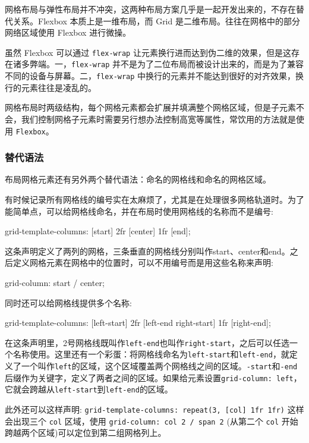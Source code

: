 网格布局与弹性布局并不冲突，这两种布局方案几乎是一起开发出来的，不存在替代关系。Flexbox 本质上是一维布局，而 Grid 是二维布局。往往在网格中的部分网络区域使用 Flexbox 进行微操。

虽然 Flexbox 可以通过 \texttt{flex-wrap} 让元素换行进而达到伪二维的效果，但是这存在诸多弊端。一，\texttt{flex-wrap} 并不是为了二位布局而被设计出来的，而是为了兼容不同的设备与屏幕。二，\texttt{flex-wrap} 中换行的元素并不能达到很好的对齐效果，换行的元素往往是凌乱的。

网格布局时两级结构，每个网格元素都会扩展并填满整个网格区域，但是子元素不会，我们控制网格子元素时需要另行想办法控制高宽等属性，常饮用的方法就是使用 \texttt{Flexbox}。

\subsubsection*{替代语法}

布局网格元素还有另外两个替代语法：命名的网格线和命名的网格区域。

有时候记录所有网格线的编号实在太麻烦了，尤其是在处理很多网格轨道时。为了能简单点，可以给网格线命名，并在布局时使用网格线的名称而不是编号:

\begin{HTML}
grid-template-columns: [start] 2fr [center] 1fr [end];
\end{HTML}

这条声明定义了两列的网格，三条垂直的网格线分别叫作start、center和end。之后定义网格元素在网格中的位置时，可以不用编号而是用这些名称来声明:

\begin{HTML}
grid-column: start / center;
\end{HTML}

同时还可以给网格线提供多个名称:

\begin{HTML}
    grid-template-columns: [left-start] 2fr [left-end right-start] 1fr [right-end];
\end{HTML}

在这条声明里，2号网格线既叫作\texttt{left-end}也叫作\texttt{right-start}，之后可以任选一个名称使用。这里还有一个彩蛋：将网格线命名为\texttt{left-start}和\texttt{left-end}，就定义了一个叫作\texttt{left}的区域，这个区域覆盖两个网格线之间的区域。\texttt{-start}和\texttt{-end}后缀作为关键字，定义了两者之间的区域。如果给元素设置\texttt{grid-column: left}，它就会跨越从\texttt{left-start}到\texttt{left-end}的区域。

此外还可以这样声明: \texttt{grid-template-columns: repeat(3, [col] 1fr 1fr)} 这样会出现三个 \texttt{col} 区域，使用 \texttt{grid-column: col 2 / span 2} (从第二个 \texttt{col} 开始跨越两个区域)可以定位到第二组网格列上。

